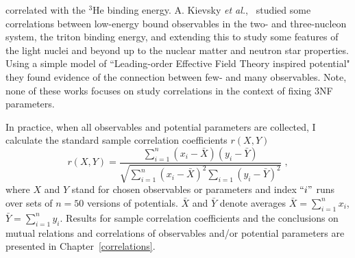 correlated with the $^{3}$He binding energy. A. Kievsky \textit{et al.},~\cite{kievsky2018correlations} studied some correlations between low-energy bound observables in the two- and three-nucleon system, the triton binding energy, and extending this to study some features of the light nuclei and beyond up to the nuclear matter and neutron star properties. Using a simple model of ``Leading-order Effective Field Theory inspired potential" they found evidence of the connection between few- and many observables. Note, none of these works focuses on study correlations in the context of fixing 3NF parameters. 

In practice, when all observables and potential parameters are collected, I calculate the standard sample correlation coefficients $r(X,Y)$
\begin{equation}
r(X,Y) = \frac{\sum\limits_{i=1}^{n}\left(x_{i} - \bar{X}\right)\left(y_{i} - \bar{Y}\right)}{\sqrt{\sum\limits_{i=1}^{n}\left(x_{i} - \bar{X}\right)^{2}\sum\limits_{i=1}\left(y_{i} - \bar{Y}\right)^{2}}}\;,
\label{correlation}
\end{equation}
where $X$ and $Y$ stand for chosen observables or parameters and index $``i"$ runs over sets of $n = 50$ versions of potentials. $\bar{X}$ and $\bar{Y}$ denote averages $\bar{X} = \sum\limits_{i=1}^{n}x_{i}$, $\bar{Y} = \sum\limits_{i=1}^{n}y_{i}$. Results for sample correlation coefficients and the conclusions on mutual relations and correlations of observables and/or potential parameters are presented in Chapter~\ref{correlations}.
